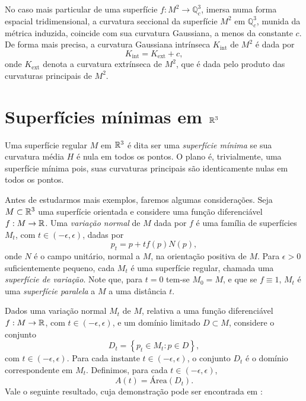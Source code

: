 No caso mais particular de uma superfície $f: M^2 \rightarrow \mathbb{Q}^3_c$, imersa numa forma espacial tridimensional, a curvatura seccional da superfície $M^2$ em $\mathbb{Q}^3_c$, munida da métrica induzida, coincide com sua curvatura Gaussiana, a menos da constante $c$. De forma mais precisa, a curvatura Gaussiana intrínseca $K_{\text{int}}$ de $M^2$ é dada por
\begin{equation}\label{eq:gausshyp}
	K_{\text{int}} = K_{\text{ext}} + c,
\end{equation}
onde $K_{\text{ext}}$ denota a curvatura extrínseca de $M^2$, que é dada pelo produto das curvaturas principais de $M^2$.


\section{Superfícies mínimas em $\mathbb{R}^3$}

Uma superfície regular $M$ em $\mathbb{R}^3$ é dita ser uma \emph{superfície mínima} se sua curvatura média $H$ é nula em todos os pontos. O plano é, trivialmente, uma superfície mínima pois, suas curvaturas principais são identicamente nulas em todos os pontos.

Antes de estudarmos mais exemplos, faremos algumas considerações. Seja $M \subset \mathbb{R}^3$ uma superfície orientada e considere uma função diferenciável $f: M \rightarrow \mathbb{R}$. Uma \emph{variação normal} de $M$ dada por $f$ é uma família de superfícies $M_t$, com $t \in (-\epsilon,\epsilon)$, dadas por
\begin{equation*}
	p_t = p + t f(p) N(p),
\end{equation*}
onde $N$ é o campo unitário, normal a $M$, na orientação positiva de $M$. Para $\epsilon > 0$ suficientemente pequeno, cada $M_t$ é uma superfície regular, chamada uma \emph{superfície de variação}. Note que, para $t=0$ tem-se $M_0 = M$, e que se $f \equiv 1$, $M_t$ é uma \emph{superfície paralela} a $M$ a uma distância $t$.

Dados uma variação normal $M_t$ de $M$, relativa a uma função diferenciável $f: M \rightarrow \mathbb{R}$, com $t \in (-\epsilon,\epsilon)$, e um domínio limitado $D \subset M$, considere o conjunto
\begin{equation*}
	D_t = \left\{ p_t \in M_t: p \in D \right\},
\end{equation*}
com $t \in (-\epsilon,\epsilon)$. Para cada instante $t \in (-\epsilon,\epsilon)$, o conjunto $D_t$ é o domínio correspondente em $M_t$. Definimos, para cada $t \in (-\epsilon,\epsilon)$,
\begin{equation*}
	A(t) = \text{Área} (D_t).
\end{equation*}
Vale o seguinte resultado, cuja demonstração pode ser encontrada em \cite{Nitsche2011}:


